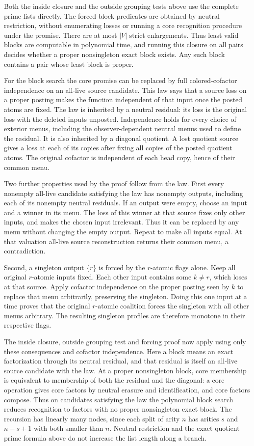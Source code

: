 Both the inside closure and the outside grouping tests
above use the complete prime lists directly. The
forced block predicates are obtained by neutral
restriction, without enumerating losses or running a
core recognition procedure under the promise. There
are at most $|V|$ strict enlargements. Thus least valid
blocks are computable in polynomial time, and running
this closure on all pairs decides whether a proper
nonsingleton exact block exists. Any such block
contains a pair whose least block is proper.

For the block search the core promise can be replaced
by full colored-cofactor independence on an all-live
source candidate. This law says that a source loss on a
proper posting makes the function independent of that
input once the posted atoms are fixed. The law is
inherited by a neutral residual: its loss is the
original loss with the deleted inputs unposted.
Independence holds for every choice of exterior menus,
including the observer-dependent neutral menus used
to define the residual. It is also inherited by a
diagonal quotient. A lost quotient source gives a
loss at each of its copies after fixing all copies
of the posted quotient atoms. The original cofactor
is independent of each head copy, hence of their
common menu.

Two further properties used by the proof follow from
the law. First every nonempty all-live candidate
satisfying the law has nonempty outputs, including
each of its nonempty neutral residuals. If an output
were empty, choose an input and a winner in its menu.
The loss of this winner at that source fixes only
other inputs, and makes the chosen input irrelevant.
Thus it can be replaced by any menu without changing
the empty output. Repeat to make all inputs equal.
At that valuation all-live source reconstruction
returns their common menu, a contradiction.

Second, a singleton output $\{r\}$ is forced by the
$r$-atomic flags alone. Keep all original $r$-atomic
inputs fixed. Each other input contains some $k\ne r$,
which loses at that source. Apply cofactor independence
on the proper posting seen by $k$ to replace that menu
arbitrarily, preserving the singleton. Doing this one
input at a time proves that the original $r$-atomic
coalition forces the singleton with all other menus
arbitrary. The resulting singleton profiles are
therefore monotone in their respective flags.

The inside closure, outside grouping test and forcing
proof now apply using only these consequences and
cofactor independence. Here a block means an exact
factorization through its neutral residual, and that
residual is itself an all-live source candidate with
the law. At a proper nonsingleton block, core
membership is equivalent to membership of both the
residual and the diagonal: a core operation gives
core factors by neutral erasure and identification,
and core factors compose. Thus on candidates
satisfying the law the polynomial block search
reduces recognition to factors with no proper
nonsingleton exact block. The recursion has linearly
many nodes, since each split of arity $n$ has arities
$s$ and $n-s+1$ with both smaller than $n$.
Neutral restriction and the exact quotient prime
formula above do not increase the list length along
a branch.

